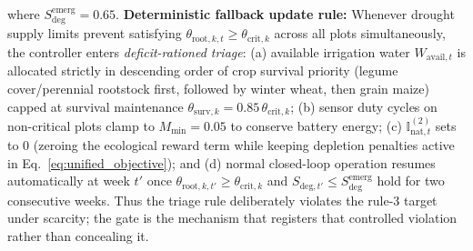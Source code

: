 \documentclass[11pt,a4paper]{article}
\newcommand{\Inatt}{\mathbb{I}_{\mathrm{nat},t}}
\begin{document}
\begin{enumerate}
  where $S_{\mathrm{deg}}^{\mathrm{emerg}} = 0.65$. \textbf{Deterministic fallback update rule:} Whenever drought supply limits prevent satisfying $\theta_{\mathrm{root},k,t} \ge \theta_{\mathrm{crit},k}$ across all plots simultaneously, the controller enters \emph{deficit-rationed triage}: (a) available irrigation water $W_{\mathrm{avail},t}$ is allocated strictly in descending order of crop survival priority (legume cover/perennial rootstock first, followed by winter wheat, then grain maize) capped at survival maintenance $\theta_{\mathrm{surv},k} = 0.85\,\theta_{\mathrm{crit},k}$; (b) sensor duty cycles on non-critical plots clamp to $M_{\min} = 0.05$ to conserve battery energy; (c) $\Inatt^{(2)}$ sets to $0$ (zeroing the ecological reward term while keeping depletion penalties active in Eq.~\eqref{eq:unified_objective}); and (d) normal closed-loop operation resumes automatically at week $t'$ once $\theta_{\mathrm{root},k,t'} \ge \theta_{\mathrm{crit},k}$ and $S_{\mathrm{deg},t'} \le S_{\mathrm{deg}}^{\mathrm{emerg}}$ hold for two consecutive weeks. Thus the triage rule deliberately violates the rule-3 target under scarcity; the gate is the mechanism that registers that controlled violation rather than concealing it.
\end{enumerate}
\end{document}
